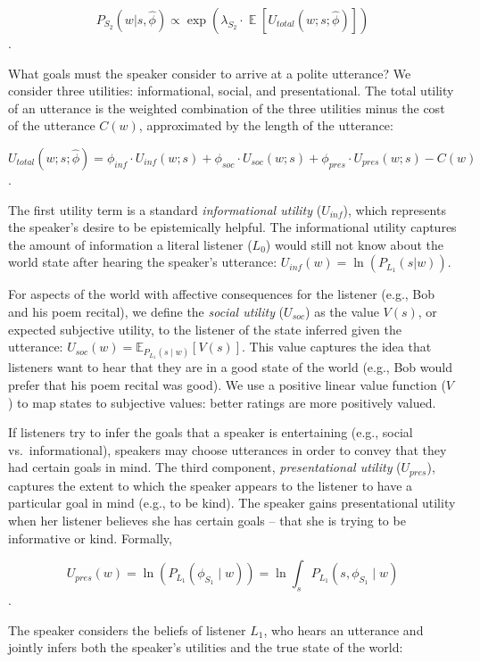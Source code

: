 \documentclass[12pt]{article}
\begin{document}
\[P_{S_2}(w | s, \hat{\phi}) \propto \exp(\lambda_{S_2} \cdot \mathop{\mathbb{E}}[U_{total}(w; s; \hat{\phi})])\].

What goals must the speaker consider to arrive at a polite utterance? We
consider three utilities: informational, social, and presentational. The
total utility of an utterance is the weighted combination of the three
utilities minus the cost of the utterance \(C(w)\), approximated by the
length of the utterance:

\[U_{total}(w; s; \hat{\phi}) = \phi_{inf} \cdot U_{inf}(w; s) + \phi_{soc} \cdot U_{soc}(w; s) + \phi_{pres} \cdot U_{pres}(w; s) - C(w)\].

The first utility term is a standard \emph{informational utility}
(\(U_{inf}\)), which represents the speaker's desire to be epistemically
helpful. The informational utility captures the amount of information a
literal listener (\(L_0\)) would still not know about the world state
after hearing the speaker's utterance:
\(U_{inf}(w) = \ln(P_{L_1}(s | w))\).

For aspects of the world with affective consequences for the listener
(e.g., Bob and his poem recital), we define the \emph{social utility}
(\(U_{soc}\)) as the value \(V(s)\), or expected subjective utility, to
the listener of the state inferred given the utterance:
\(U_{soc}(w) = \mathbb{E}_{P_{L_1}(s \mid w)}[V(s)]\). This value
captures the idea that listeners want to hear that they are in a good
state of the world (e.g., Bob would prefer that his poem recital was
good). We use a positive linear value function (\(V\)) to map states to
subjective values: better ratings are more positively valued.

If listeners try to infer the goals that a speaker is entertaining
(e.g., social vs.~informational), speakers may choose utterances in
order to convey that they had certain goals in mind. The third
component, \emph{presentational utility} (\(U_{pres}\)), captures the
extent to which the speaker appears to the listener to have a particular
goal in mind (e.g., to be kind). The speaker gains presentational
utility when her listener believes she has certain goals -- that she is
trying to be informative or kind. Formally,

\[U_{pres}(w) = \ln(P_{L_1}(\phi_{S_1} \mid w)) = \ln \int_s P_{L_1}(s, \phi_{S_1} \mid w)\].

The speaker considers the beliefs of listener \(L_1\), who hears an
utterance and jointly infers both the speaker's utilities and the true
state of the world:
\end{document}

